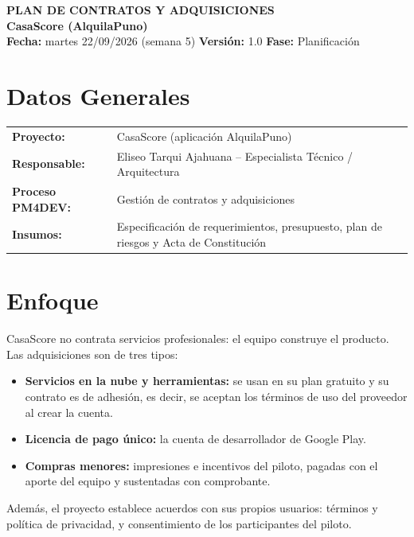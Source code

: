 \documentclass[11pt,a4paper]{article}
\begin{document}
\begin{center}
    {\Large \textbf{\textcolor{AzulUNA}{PLAN DE CONTRATOS Y ADQUISICIONES}}}\\[3pt]
    {\normalsize \textbf{CasaScore (AlquilaPuno)}}\\[4pt]
    \footnotesize \textbf{Fecha:} martes 22/09/2026 (semana 5) \quad \textbar\quad \textbf{Versión:} 1.0 \quad \textbar\quad \textbf{Fase:} Planificación
\end{center}

\vspace{0.1cm}

\section{Datos Generales}
\noindent\begin{tabularx}{\textwidth}{@{}P{4.2cm} L@{}}
\toprule
\textbf{Proyecto:} & CasaScore (aplicación AlquilaPuno) \\
\textbf{Responsable:} & Eliseo Tarqui Ajahuana -- Especialista Técnico / Arquitectura \\
\textbf{Proceso PM4DEV:} & Gestión de contratos y adquisiciones \\
\textbf{Insumos:} & Especificación de requerimientos, presupuesto, plan de riesgos y Acta de Constitución \\
\bottomrule
\end{tabularx}

\section{Enfoque}
CasaScore no contrata servicios profesionales: el equipo construye el producto. Las adquisiciones son de tres tipos:
\begin{itemize}[leftmargin=*]
    \item \textbf{Servicios en la nube y herramientas:} se usan en su plan gratuito y su contrato es de adhesión, es decir, se aceptan los términos de uso del proveedor al crear la cuenta.
    \item \textbf{Licencia de pago único:} la cuenta de desarrollador de Google Play.
    \item \textbf{Compras menores:} impresiones e incentivos del piloto, pagadas con el aporte del equipo y sustentadas con comprobante.
\end{itemize}
Además, el proyecto establece acuerdos con sus propios usuarios: términos y política de privacidad, y consentimiento de los participantes del piloto.
\end{document}
